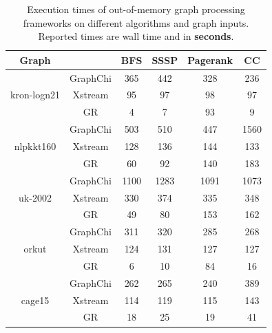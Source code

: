 \begin{table}[h]%
\centering
\begin{tabular}{|c|c|c|c|c|c|}
\hline
Graph &  & BFS & SSSP & Pagerank & CC \\ \hline
\multirow{3}{*}{kron-logn21} & GraphChi & 365 & 442 & 328 & 236 \\ \cline{2-6} 
 & Xstream & 95 & 97 & 98 & 97 \\ \cline{2-6} 
 & GR & 4 & 7 & 93 & 9 \\ \hline
\multirow{3}{*}{nlpkkt160} & GraphChi & 503 & 510 & 447 & 1560 \\ \cline{2-6} 
 & Xstream & 128 & 136 & 144 & 133 \\ \cline{2-6} 
 & GR & 60 & 92 & 140 & 183 \\ \hline
\multirow{3}{*}{uk-2002} & GraphChi & 1100 & 1283 & 1091 & 1073 \\ \cline{2-6} 
 & Xstream & 330 & 374 & 335 & 348 \\ \cline{2-6} 
 & GR & 49 & 80 & 153 & 162 \\ \hline
\multirow{3}{*}{orkut} & GraphChi & 311 & 320 & 285 & 268 \\ \cline{2-6} 
 & Xstream & 124 & 131 & 127 & 127 \\ \cline{2-6} 
 & GR & 6 & 10 & 84 & 16 \\ \hline
\multirow{3}{*}{cage15} & GraphChi & 262 & 265 & 240 & 389 \\ \cline{2-6} 
 & Xstream & 114 & 119 & 115 & 143 \\ \cline{2-6} 
 & GR & 18 & 25 & 19 & 41 \\ \hline
\end{tabular}
\caption{Execution times of out-of-memory graph processing frameworks on different algorithms and graph inputs. Reported times are wall time and in {\bf seconds}.}
\label{bigdata}
\end{table}


